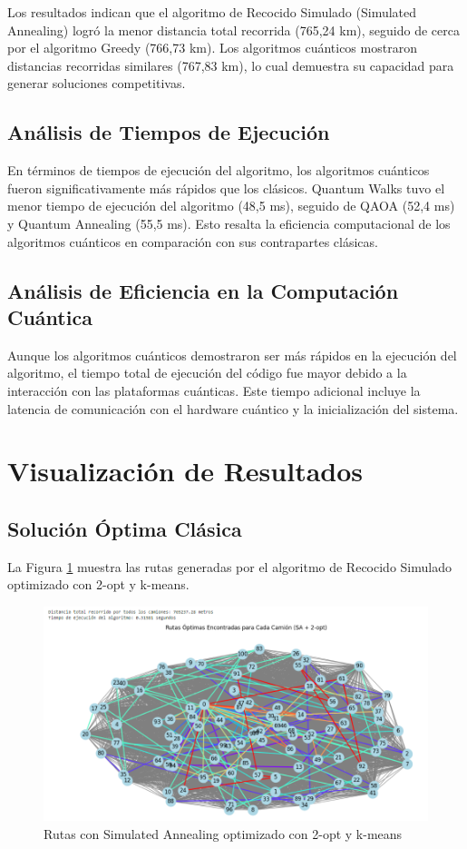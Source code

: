 \documentclass[11pt,a4paper,spanish]{book}
\begin{document}
Los resultados indican que el algoritmo de Recocido Simulado (Simulated Annealing) logró la menor distancia total recorrida (765,24 km), seguido de cerca por el algoritmo Greedy (766,73 km). Los algoritmos cuánticos mostraron distancias recorridas similares (767,83 km), lo cual demuestra su capacidad para generar soluciones competitivas.

\subsection{Análisis de Tiempos de Ejecución}

En términos de tiempos de ejecución del algoritmo, los algoritmos cuánticos fueron significativamente más rápidos que los clásicos. Quantum Walks tuvo el menor tiempo de ejecución del algoritmo (48,5 ms), seguido de QAOA (52,4 ms) y Quantum Annealing (55,5 ms). Esto resalta la eficiencia computacional de los algoritmos cuánticos en comparación con sus contrapartes clásicas.

\subsection{Análisis de Eficiencia en la Computación Cuántica}

Aunque los algoritmos cuánticos demostraron ser más rápidos en la ejecución del algoritmo, el tiempo total de ejecución del código fue mayor debido a la interacción con las plataformas cuánticas. Este tiempo adicional incluye la latencia de comunicación con el hardware cuántico y la inicialización del sistema.

\section{Visualización de Resultados}

\subsection{Solución Óptima Clásica}

La Figura \ref{fig:solucionSA2opt} muestra las rutas generadas por el algoritmo de Recocido Simulado optimizado con 2-opt y k-means.

\begin{figure}[H]
\centering
\includegraphics[width=1\linewidth]{solucionSA2opt.png}
\caption{Rutas con Simulated Annealing optimizado con 2-opt y k-means}
\label{fig:solucionSA2opt}
\end{figure}
\end{document}
